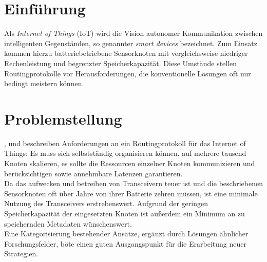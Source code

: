 \documentclass[10pt,a4paper,fleqn, twocolumn]{article}
\begin{document}
  \renewcommand{\labelenumi}{(\alph{enumi})}
  \renewcommand\headrule{\vspace{+2pt}\hrule}
  \newcommand{\solved}{\[\hfill\Box\]}
  \setlength{\headheight}{2.5\baselineskip}
  \pagestyle{fancyplain}

  \rhead{\today}
 

\section{Einführung}

Als \emph{Internet of Things} (IoT) wird die Vision autonomer Kommunikation zwischen intelligenten Gegenständen, so genannter \emph{smart devices} bezeichnet.
Zum Einsatz kommen hierzu batteriebetriebene Sensorknoten mit vergleichsweise niedriger Rechenleistung und begrenzter Speicherkapazität\cite{KULeuven-314567}.
Diese Umstände stellen Routingprotokolle vor Herausforderungen, die konventionelle Lösungen oft nur bedingt meistern können.


\section{Problemstellung}
\label{sec:problemstellung}

\cite{RFC5826}, \cite{RFC5548} und \cite{RFC5867} beschreiben Anforderungen an ein Routingprotokoll für das Internet of Things: Es muss sich selbstständig %
organisieren können, auf mehrere tausend Knoten skalieren, es sollte die Ressourcen einzelner Knoten kommunizieren und berücksichtigen sowie annehmbare Latenzen garantieren.\\
Da das aufwecken und betreiben von Transceivern teuer ist %
und die beschriebenen Sensorknoten oft über Jahre von ihrer Batterie zehren müssen, ist eine minimale Nutzung des Transceivers erstrebenswert. Aufgrund der geringen Speicherkapazität der eingesetzten Knoten ist außerdem ein Minimum an zu speichernden Metadaten wünschenswert.\\
Eine Kategorisierung bestehender Ansätze, ergänzt durch Lösungen ähnlicher Forschungsfelder, böte einen guten Ausgangspunkt für die Erarbeitung neuer Strategien.
\end{document}
